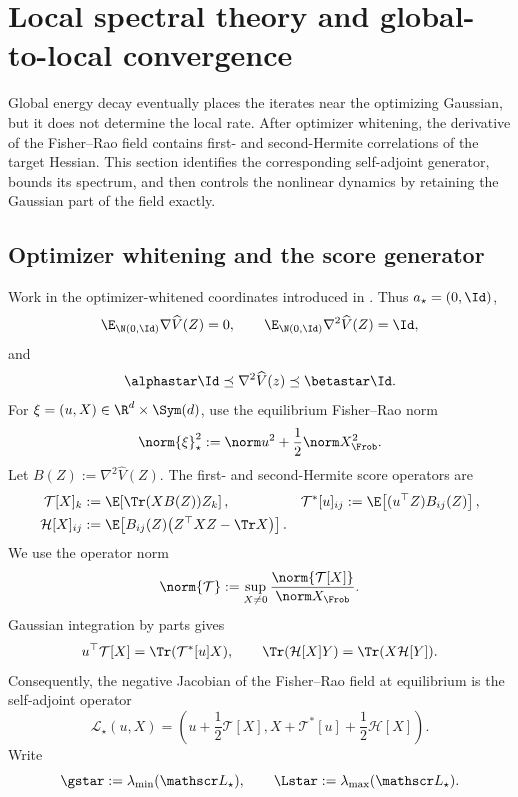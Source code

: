 \section{Local spectral theory and global-to-local convergence}
\label{sec:local}

Global energy decay eventually places the iterates near the optimizing
Gaussian, but it does not determine the local rate.  After optimizer
whitening, the derivative of the Fisher--Rao field contains first- and
second-Hermite correlations of the target Hessian.  This section identifies
the corresponding self-adjoint generator, bounds its spectrum, and then
controls the nonlinear dynamics by retaining the Gaussian part of the field
exactly.

\subsection{Optimizer whitening and the score generator}
\label{sec:local-linearization}

Work in the optimizer-whitened coordinates introduced in
.  Thus \(a_\star=(0,\Id)\),
\[
  \E_{\N(0,\Id)}\nabla\widehat V(Z)=0,\qquad
  \E_{\N(0,\Id)}\nabla^2\widehat V(Z)=\Id,
\]
and
\[
  \alphastar\Id\preceq\nabla^2\widehat V(z)
  \preceq\betastar\Id.
\]
For \(\xi=(u,X)\in\R^d\times\Sym(d)\), use the equilibrium Fisher--Rao norm
\begin{equation}
  \norm{\xi}_\star^2
  :=\norm u^2+\frac12\norm X_{\Frob}^2.
  \label{eq:local-equilibrium-norm}
\end{equation}
Let \(B(Z):=\nabla^2\widehat V(Z)\).  The first- and second-Hermite score
operators are
\begin{align}
  \mathcal T[X]_k
  &:=\E\!\left[\Tr(XB(Z))Z_k\right],
  &
  \mathcal T^\ast[u]_{ij}
  &:=\E\!\left[(u^\top Z)B_{ij}(Z)\right],
  \label{eq:local-first-hermite}\\
  \mathcal H[X]_{ij}
  &:=\E\!\left[
      B_{ij}(Z)\bigl(Z^\top XZ-\Tr X\bigr)
    \right].
  \label{eq:local-second-hermite}
\end{align}
We use the operator norm
\begin{equation}
  \norm{\mathcal T}
  :=
  \sup_{X\neq0}
  \frac{\norm{\mathcal T[X]}}{\norm X_{\Frob}}.
  \label{eq:local-first-hermite-operator-norm}
\end{equation}
Gaussian integration by parts gives
\[
  u^\top\mathcal T[X]=\Tr(\mathcal T^\ast[u]X),
  \qquad
  \Tr(\mathcal H[X]Y)=\Tr(X\mathcal H[Y]).
\]
Consequently, the negative Jacobian of the Fisher--Rao field at equilibrium
is the self-adjoint operator
\begin{equation}
  \mathscr L_\star(u,X)
  =
  \left(
    u+\frac12\mathcal T[X],
    X+\mathcal T^\ast[u]+\frac12\mathcal H[X]
  \right).
  \label{eq:local-generator}
\end{equation}
Write
\[
  \gstar:=\lambda_{\min}(\mathscr L_\star),
  \qquad
  \Lstar:=\lambda_{\max}(\mathscr L_\star).
\]

